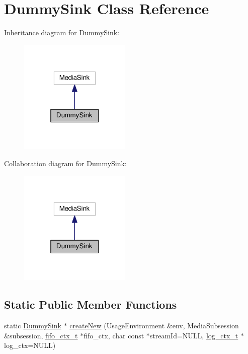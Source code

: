 \hypertarget{classDummySink}{}\section{Dummy\+Sink Class Reference}
\label{classDummySink}


Inheritance diagram for Dummy\+Sink\+:\nopagebreak
\begin{figure}[H]
\begin{center}
\leavevmode
\includegraphics[width=151pt]{classDummySink__inherit__graph}
\end{center}
\end{figure}


Collaboration diagram for Dummy\+Sink\+:\nopagebreak
\begin{figure}[H]
\begin{center}
\leavevmode
\includegraphics[width=151pt]{classDummySink__coll__graph}
\end{center}
\end{figure}
\subsection*{Static Public Member Functions}
\begin{DoxyCompactItemize}
\item 
static \hyperlink{classDummySink}{Dummy\+Sink} $\ast$ \hyperlink{classDummySink_af1d373302d3f27791ac565136321765b}{create\+New} (Usage\+Environment \&env, Media\+Subsession \&subsession, \hyperlink{structfifo__ctx__s}{fifo\+\_\+ctx\+\_\+t} $\ast$fifo\+\_\+ctx, char const $\ast$stream\+Id=N\+U\+LL, \hyperlink{structlog__ctx__s}{log\+\_\+ctx\+\_\+t} $\ast$log\+\_\+ctx=N\+U\+LL)
\end{DoxyCompactItemize}


